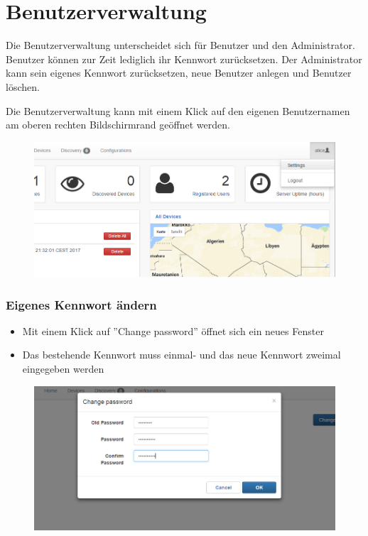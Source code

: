 \section{Benutzerverwaltung}
Die Benutzerverwaltung unterscheidet sich für Benutzer und den Administrator. Benutzer können zur Zeit lediglich ihr Kennwort zurücksetzen. Der Administrator kann sein eigenes Kennwort zurücksetzen, neue Benutzer anlegen und Benutzer löschen.

Die Benutzerverwaltung kann mit einem Klick auf den eigenen Benutzernamen am oberen rechten Bildschirmrand geöffnet werden.
\begin{figure}[H]
\includegraphics[scale=0.65]{../05_Schlussbericht/images/benutzeranleitung/usersettings.png}
\end{figure}

\subsubsection{Eigenes Kennwort ändern}
\begin{itemize}
\item Mit einem Klick auf ''Change password'' öffnet sich ein neues Fenster
\item Das bestehende Kennwort muss einmal- und das neue Kennwort zweimal eingegeben werden
\end{itemize}

\begin{figure}[H]
\includegraphics[scale=0.65]{../05_Schlussbericht/images/benutzeranleitung/change_password.png}
\end{figure}

